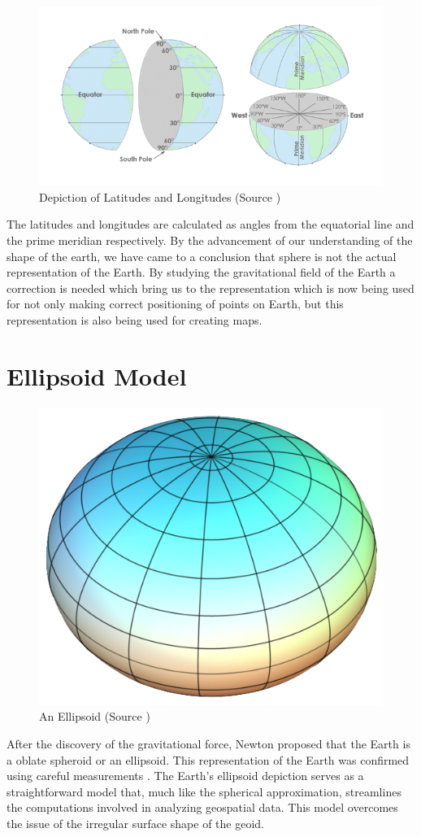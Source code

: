 \begin{figure}[h]
    \centering
    \includegraphics[width=0.7\linewidth]{figures/chapter-2/lat_lon.png}
    \caption{Depiction of Latitudes and Longitudes (Source \cite{GISGEO_LatLon}) }
    \label{fig:shpere-image}
\end{figure}

The latitudes and longitudes are calculated as angles from the equatorial line and the prime meridian respectively. By the advancement of our understanding of the
shape of the earth, we have came to a conclusion that sphere is not the actual representation of the Earth. By studying the gravitational field of the Earth a
correction is needed which bring us to the representation which is now being used for not only making correct positioning of points on Earth,
but this representation is also being used for creating maps.

\section{Ellipsoid Model}

\begin{figure}[h]
    \centering
    \includegraphics[width=0.4\linewidth]{figures/chapter-2/elipsoid.png}
    \caption{An Ellipsoid (Source \cite{GISGEO_Ellipsoid}) }
    \label{fig:ellipsoid-image}
\end{figure}
After the discovery of the gravitational force, Newton proposed that the Earth is a oblate spheroid or an ellipsoid. This representation of the Earth was confirmed using careful measurements \cite{Osserman2006-ys}. The Earth's ellipsoid depiction serves as a straightforward model that, much like the spherical approximation, streamlines the computations involved in analyzing geospatial data.
This model overcomes the issue of the irregular surface shape of the geoid.

